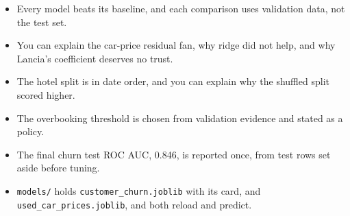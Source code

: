 \begin{labchecklists}
\begin{verification}
\begin{itemize}
  \item Every model beats its baseline, and each comparison uses validation data, not the test set.
  \item You can explain the car-price residual fan, why ridge did not help, and why Lancia's coefficient deserves no trust.
  \item The hotel split is in date order, and you can explain why the shuffled split scored higher.
  \item The overbooking threshold is chosen from validation evidence and stated as a policy.
  \item The final churn test ROC AUC, 0.846, is reported once, from test rows set aside before tuning.
  \item \texttt{models/} holds \texttt{customer\_churn.joblib} with its card, and \texttt{used\_car\_prices.joblib}, and both reload and predict.
\end{itemize}
\end{verification}
\end{labchecklists}
